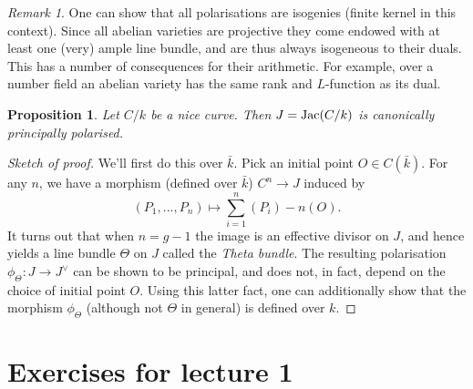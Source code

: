 \documentclass[12pt]{amsart}
\numberwithin{equation}{section}
\newtheorem{proposition}[equation]{Proposition}
\theoremstyle{remark}
\newtheorem{remark}[equation]{Remark}
\theoremstyle{definition}
\theoremstyle{definition}
\theoremstyle{definition}
\theoremstyle{definition}
\theoremstyle{definition}
\theoremstyle{definition}
\begin{document}
\begin{remark}
One can show that all polarisations are isogenies (finite kernel in this context). 
Since all abelian varieties are projective they come endowed with at least one (very) ample line bundle, and are thus always isogeneous to their duals. This has a number of consequences for their arithmetic. For example, over a number field an abelian variety has the same rank and $L$-function as its dual.
\end{remark}

\begin{proposition}
Let $C/k$ be a nice curve. Then $J=\textup{Jac}(C/k)$ is canonically principally polarised. 
\end{proposition}

\begin{proof}[Sketch of proof]
We'll first do this over $\bar{k}$. Pick an initial point $O\in C(\bar{k})$. For any $n$, we have a morphism (defined over $\bar{k}$) $C^n\rightarrow J$ induced by
\[(P_1,...,P_n)\mapsto \sum_{i=1}^n (P_i) - n(O).\]
It turns out that when $n=g-1$ the image is an effective divisor on $J$, and hence yields a line bundle $\Theta$ on $J$ called the \textit{Theta bundle}. The resulting polarisation $\phi_\Theta:J\rightarrow J^\vee$ can be shown to be principal, and does not, in fact, depend on the choice of initial point $O$. Using this latter fact, one can additionally show that the morphism $\phi_{\Theta}$ (although not $\Theta$ in general) is defined over $k$.
\end{proof}

\newpage

\section{Exercises for lecture 1}
\end{document}
